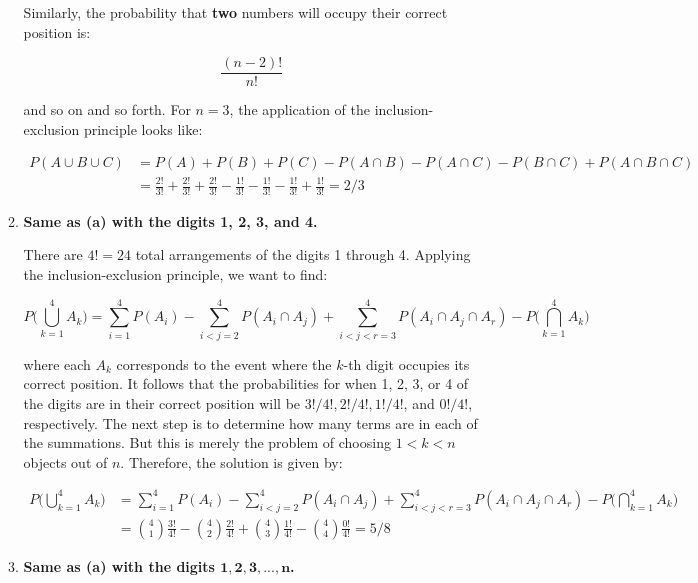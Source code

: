\documentclass[10pt, oneside]{article}   	%
\theoremstyle{definition}
\begin{document}
\begin{enumerate}[label=2.\arabic*]
\begin{enumerate}
	Similarly, the probability that \textbf{two} numbers will occupy their correct position is:
	
	\[ \frac{(n-2)!}{n!} \]
	
	and so on and so forth. For $n = 3$, the application of the inclusion-exclusion principle looks like:
	
	\begin{align*}
	P(A \cup B \cup C) &= P(A) + P(B) + P(C) - P(A \cap B) - P(A \cap C) - P(B \cap C) + P(A \cap B \cap C) \\
	&= \frac{2!}{3!} +  \frac{2!}{3!} +  \frac{2!}{3!} - \frac{1!}{3!} -  \frac{1!}{3!} -  \frac{1!}{3!} +  \frac{1!}{3!} = \boxed{2/3}
	\end{align*}
	\item \begin{tcolorbox}[
  colback=Cerulean!5!white,
  colframe=Cerulean!75!black] \textbf{Same as (a) with the digits 1, 2, 3, and 4.}
	\end{tcolorbox}
	
	There are $4! = 24$ total arrangements of the digits 1 through 4. Applying the inclusion-exclusion principle, we want to find:
	
	\[ P\Bigg( \bigcup^4_{k=1} A_k \Bigg) = \sum_{i = 1}^4 P(A_i) - \sum_{i < j = 2}^4 P(A_i \cap A_j) + \sum_{i < j < r = 3}^4 P(A_i \cap A_j \cap A_r) - P \Bigg( \bigcap^4_{k=1} A_k \Bigg) \]
	
	where each $A_k$ corresponds to the event where the $k$-th digit occupies its correct position. It follows that the probabilities for when 1, 2, 3, or 4 of the digits are in their correct position will be $3! / 4!, 2! / 4!, 1! / 4!$, and $0! / 4!$, respectively. The next step is to determine how many terms are in each of the summations. But this is merely the problem of choosing $1 < k < n$ objects out of $n$. Therefore, the solution is given by:
	
	\begin{align*}
	P\Bigg( \bigcup^4_{k=1} A_k \Bigg) &= \sum_{i = 1}^4 P(A_i) - \sum_{i < j = 2}^4 P(A_i \cap A_j) + \sum_{i < j < r = 3}^4 P(A_i \cap A_j \cap A_r) - P \Bigg( \bigcap^4_{k=1} A_k \Bigg)  \\
	&= \binom {4}{1} \frac{3!}{4!} - \binom {4}{2} \frac{2!}{4!} + \binom{4}{3} \frac{1!}{4!} - \binom{4}{4} \frac{0!}{4!} = \boxed{5/8}
	\end{align*}

\newpage
	\item  \begin{tcolorbox}[
  colback=Cerulean!5!white,
  colframe=Cerulean!75!black]
  \textbf{Same as (a) with the digits $\bm{1, 2, 3, ..., n}$. }
	\end{tcolorbox}
	

\end{enumerate}
\end{enumerate}
\end{document}
